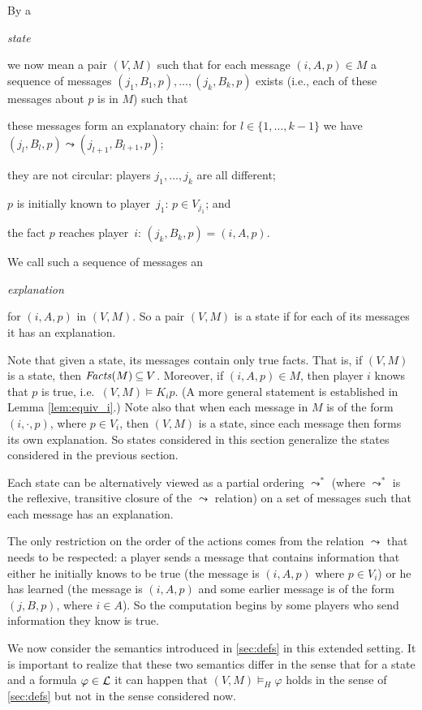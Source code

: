 \documentclass{article}
\newcounter{#1}
\newcommand{\oldbfe}[1]{\begin{bfseries}\emph{#1}\end{bfseries}}
\newcommand{\sse}{\mbox{$\:\subseteq\:$}}
\newcommand{\LL}{\mbox{$\ldots$}}
\newcommand{\state}[1][]{\ensuremath{(V#1,M#1)}\xspace}
\newcommand{\knows}[1]{\ensuremath{K_{#1}}\xspace}
\begin{document}
By a \oldbfe{state} we now mean a pair $(V, M)$ such that for
each message $(i,A,p) \in M$ a sequence of messages $(j_1, B_1, p),
\LL, (j_k, B_k, p)$ exists (i.e., each of these messages about $p$ is in $M$) such
that
\begin{compactitem}
\item these messages form an explanatory chain:
  for $l \in \{1, \LL, k-1\}$ we have $(j_l, B_l, p) \leadsto (j_{l+1}, B_{l+1}, p)$;
\item they are not circular: players $j_1, \LL, j_k$ are all different;
\item $p$ is initially known to player~$j_1$: $p \in V_{j_1}$; and
\item the fact $p$ reaches player~$i$: $(j_k, B_k, p) = (i,A,p)$.
\end{compactitem}
We call such a sequence of messages an \oldbfe{explanation} for $(i,A,p)$ in 
$(V, M)$. So a pair $\state$ is a state if for each of its messages it has an explanation. 

Note that given a state, its messages contain only true facts. That
is, if $(V, M)$ is a state, then $\Facts(M) \sse V$.
Moreover, if $(i,A,p) \in M$, then player $i$ knows that $p$ is true,
i.e.~$(V,M) \vDash \knows i p$.
(A more general statement is established in Lemma \ref{lem:equiv_i}.)
Note also that when each message in $M$ is of the form $(i,\cdot,p)$,
where $p \in V_i$, then $(V, M)$ is a state, since each message then forms
its own explanation. So states considered in this section generalize the
states considered in the previous section.

Each state can be alternatively viewed as a partial ordering
$\leadsto^*$ (where $\leadsto^*$ is the reflexive, transitive
closure of the $\leadsto$ relation) on a set of messages such that each message
has an explanation.



The only restriction on the order of the actions comes from the
relation $\leadsto$ that needs to be respected: a player sends a
message that contains information that either he initially knows to be true (the
message is $(i,A,p)$ where $p \in V_i$) or he has learned
(the message is $(i,A,p)$ and some earlier message is of the form
$(j,B,p)$, where $i \in A$).  So the computation begins by some
players who send information they know is true.

We now consider the semantics introduced in \cref{sec:defs} in this
extended setting. It is important to realize that these two semantics
differ in the sense that for a state
and a formula $\varphi \in {\cal L}$ it can happen that
$\state\vDash_H \varphi$ holds in the sense of \cref{sec:defs} but not
in the sense considered now.
\end{document}
